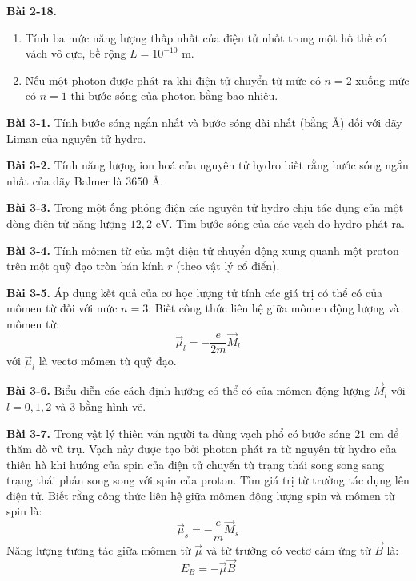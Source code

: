 \expandafter\def\csname debai@2-18\endcsname{
\textbf{Bài 2-18.}
\begin{enumerate}[label=\alph*)]
  \item Tính ba mức năng lượng thấp nhất của điện tử nhốt trong một hố thế có vách vô cực, bề rộng $L = 10^{-10}\text{ m}$.
  \item Nếu một photon được phát ra khi điện tử chuyển từ mức có $n = 2$ xuống mức có $n = 1$ thì bước sóng của photon bằng bao nhiêu.
\end{enumerate}
}

\expandafter\def\csname debai@3-1\endcsname{
\textbf{Bài 3-1.} Tính bước sóng ngắn nhất và bước sóng dài nhất (bằng $\text{\AA}$) đối với dãy Liman của nguyên tử hydro.
}

\expandafter\def\csname debai@3-2\endcsname{
\textbf{Bài 3-2.} Tính năng lượng ion hoá của nguyên tử hydro biết rằng bước sóng ngắn nhất của dãy Balmer là $3650\text{ \AA}$.
}

\expandafter\def\csname debai@3-3\endcsname{
\textbf{Bài 3-3.} Trong một ống phóng điện các nguyên tử hydro chịu tác dụng của một dòng điện tử năng lượng $12{,}2\text{ eV}$. Tìm bước sóng của các vạch do hydro phát ra.
}

\expandafter\def\csname debai@3-4\endcsname{
\textbf{Bài 3-4.} Tính mômen từ của một điện tử chuyển động xung quanh một proton trên một quỹ đạo tròn bán kính $r$ (theo vật lý cổ điển).
}

\expandafter\def\csname debai@3-5\endcsname{
\textbf{Bài 3-5.} Áp dụng kết quả của cơ học lượng tử tính các giá trị có thể có của mômen từ đối với mức $n = 3$. Biết công thức liên hệ giữa mômen động lượng và mômen từ:
\begin{equation*}
    \vec{\mu}_l = -\frac{e}{2m}\vec{M}_l
\end{equation*}
với $\vec{\mu}_l$ là vectơ mômen từ quỹ đạo.
}

\expandafter\def\csname debai@3-6\endcsname{
\textbf{Bài 3-6.} Biểu diễn các cách định hướng có thể có của mômen động lượng $\vec{M}_l$ với $l = 0, 1, 2$ và $3$ bằng hình vẽ.
}

\expandafter\def\csname debai@3-7\endcsname{
\textbf{Bài 3-7.} Trong vật lý thiên văn người ta dùng vạch phổ có bước sóng $21\text{ cm}$ để thăm dò vũ trụ. Vạch này được tạo bởi photon phát ra từ nguyên tử hydro của thiên hà khi hướng của spin của điện tử chuyển từ trạng thái song song sang trạng thái phản song song với spin của proton. Tìm giá trị từ trường tác dụng lên điện tử. Biết rằng công thức liên hệ giữa mômen động lượng spin và mômen từ spin là:
\begin{equation*}
    \vec{\mu}_s = -\frac{e}{m}\vec{M}_s
\end{equation*}
Năng lượng tương tác giữa mômen từ $\vec{\mu}$ và từ trường có vectơ cảm ứng từ $\vec{B}$ là:
\begin{equation*}
    E_B = -\vec{\mu}\vec{B}
\end{equation*}
}

